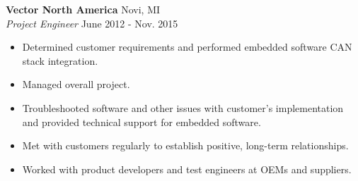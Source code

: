 \vspace{0.75em}

\noindent
\textbf{Vector North America} \hfill Novi, MI \\
\textit{Project Engineer} \hfill June 2012 - Nov. 2015 \\
\begin{itemize}[leftmargin=*,noitemsep,topsep=3pt]
    \item Determined customer requirements and performed embedded software CAN stack integration.
    \item Managed overall project.
    \item Troubleshooted software and other issues with customer's implementation and provided technical support for embedded software.
    \item Met with customers regularly to establish positive, long-term relationships.
    \item Worked with product developers and test engineers at OEMs and suppliers.
\end{itemize}